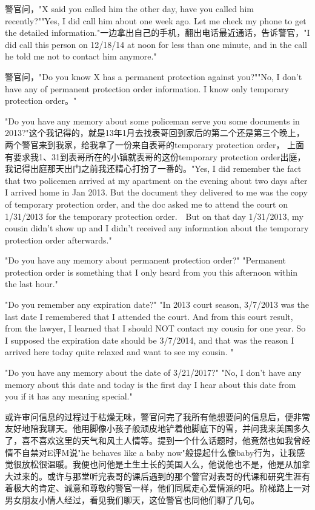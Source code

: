 \documentclass[12pt]{book}
\begin{document}
警官问，"X said you called him the other day, have you called him recently?""Yes, I did call him about one week ago. Let me check my phone to get the detailed information."一边拿出自己的手机，翻出电话最近通话，告诉警官，"I did call this person on 12/18/14 at noon for less than one minute, and in the call he told me not to contact him anymore."

警官问，"Do you know X has a permanent protection against you?""No, I don't have any of permanent protection order information. I know only temporary protection order。"

"Do you have any memory about some policeman serve you some documents in 2013?"这个我记得的，就是13年1月去找表哥回到家后的第二个还是第三个晚上，两个警官来到我家，给我拿了一份来自表哥的temporary protection order， 上面有要求我1、31到表哥所在的小镇就表哥的这份temporary protection order出庭，我记得出庭那天出门之前我还精心打扮了一番的。"Yes, I did remember the fact that two policemen arrived at my apartment on the evening about two days after I arrived home in Jan 2013. But the document they delivered to me was the copy of temporary protection order, and the doc asked me to attend the court on 1/31/2013 for the temporary protection order.　But on that day 1/31/2013, my cousin didn't show up and I didn't received any information about the temporary protection order afterwards."

"Do you have any memory about permanent protection order?" "Permanent protection order is something that I only heard from you this afternoon within the last hour."

"Do you remember any expiration date?" "In 2013 court season, 3/7/2013 was the last date I remembered that I attended the court. And from this court result, from the lawyer, I learned that I should NOT contact my cousin for one year. So I supposed the expiration date should be 3/7/2014, and that was the reason I arrived here today quite relaxed and want to see my cousin. "

"Do you have any memory about the date of 3/21/2017?" "No, I don't have any memory about this date and today is the first day I hear about this date from you if it has any meaning special."

或许审问信息的过程过于枯燥无味，警官问完了我所有他想要问的信息后，便非常友好地陪我聊天。他用脚像小孩子般顽皮地铲着他脚底下的雪，并问我来美国多久了，喜不喜欢这里的天气和风土人情等。提到一个什么话题时，他竟然也如我曾经情不自禁对E评M说"he behaves like a baby now"般提起什么像baby行为，让我感觉很放松很温暖。我便也问他是土生土长的美国人么，他说他也不是，他是从加拿大过来的。或许与那堂听完表哥的课后遇到的那个警官对表哥的代课和研究生涯有着极大的肯定、诚意和尊敬的警官一样，他们同属走心爱情派的吧。阶梯路上一对男女朋友小情人经过，看见我们聊天，这位警官也同他们聊了几句。
\end{document}
